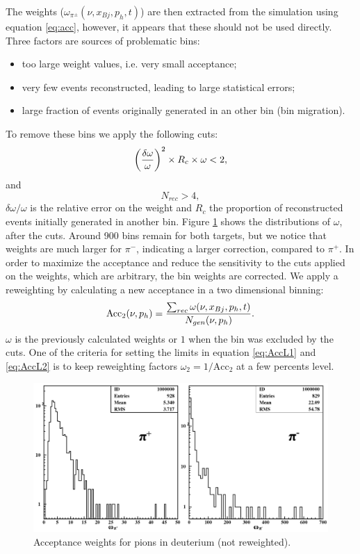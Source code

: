 The weights ($\omega_{\pi^\pm}(\nu,x_{Bj},p_h,t)$) are then extracted from 
the simulation using equation \ref{eq:acc}, however, it appears that these should not be used directly.
Three factors are sources of problematic bins:
\begin{itemize}
 \item too large weight values, i.e. very small acceptance;
 \item very few events reconstructed, leading to large statistical errors;
 \item large fraction of events originally generated in an other bin (bin migration).
\end{itemize}
To remove these bins we apply the following cuts:
\begin{equation} \label{eq:AccL1}
\left ({\delta \omega \over \omega}\right ) ^2 \times R_c \times \omega < 2,
\end{equation}
and
\begin{equation} \label{eq:AccL2}
N_{rec} > 4,
\end{equation}
$\delta \omega / \omega$ is the relative error on the weight and $R_c$ the 
proportion of reconstructed events initially generated in another bin. Figure 
\ref{fig:AccCoef} shows the distributions of $\omega$, after the cuts. Around 
900 bins remain for both targets, but we notice that weights are much larger 
for $\pi^-$, indicating a larger correction, compared to $\pi^+$. In order to 
maximize the acceptance and reduce the sensitivity to the cuts applied on the 
weights, which are arbitrary, the bin weights are corrected. We apply a 
reweighting by calculating a new acceptance in a two dimensional binning:
\begin{equation}
\text{Acc}_2(\nu,p_h) = {\sum_{rec} \omega (\nu,x_{Bj},p_h,t)\over N_{gen}(\nu,p_h)}.
\end{equation}
$\omega$ is the previously calculated weights or $1$ when the 
bin was excluded by the cuts.
One of the criteria for setting the limits in equation \ref{eq:AccL1} and 
\ref{eq:AccL2} is to keep reweighting factors $\omega_2 = 1/\text{Acc}_2$ at a few 
percents level.

\begin{figure}[tbp]
\centering
\includegraphics[width=14cm] {chap5-fig/pawpipdeut.png}
\caption {Acceptance weights for pions in deuterium (not reweighted).}
\label{fig:AccCoef}
\end{figure}

